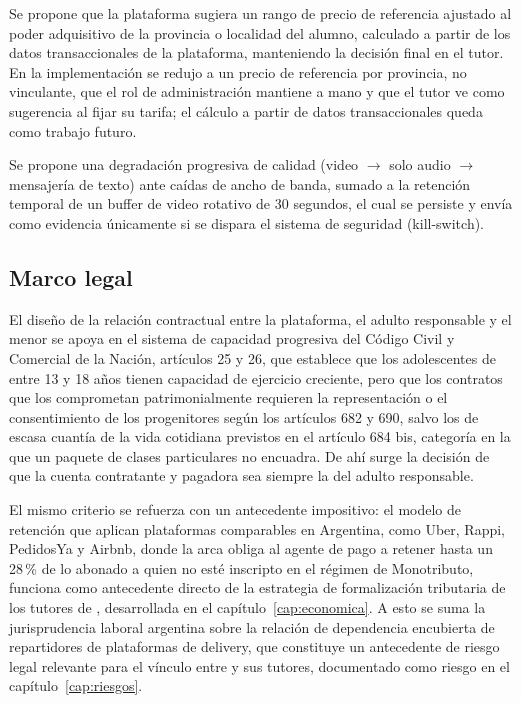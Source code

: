 \begin{description}[style=unboxed]
    \item[Precio dinámico por poder adquisitivo regional.] Se propone que
    la plataforma sugiera un rango de precio de referencia ajustado al
    poder adquisitivo de la provincia o localidad del alumno, calculado a
    partir de los datos transaccionales de la plataforma, manteniendo la
    decisión final en el tutor. En la implementación se redujo a un precio
    de referencia por provincia, no vinculante, que el rol de
    administración mantiene a mano y que el tutor ve como sugerencia al
    fijar su tarifa; el cálculo a partir de datos transaccionales queda
    como trabajo futuro.

    \item[Modo de baja conectividad.] Se propone una degradación
    progresiva de calidad (video $\rightarrow$ solo audio
    $\rightarrow$ mensajería de texto) ante caídas de ancho de banda,
    sumado a la retención temporal de un buffer de video rotativo de 30
    segundos, el cual se persiste y envía como evidencia únicamente si se
    dispara el sistema de seguridad (kill-switch).
\end{description}

\subsection{Marco legal}

El diseño de la relación contractual entre la plataforma, el adulto
responsable y el menor se apoya en el sistema de capacidad progresiva
del Código Civil y Comercial de la Nación, artículos 25 y 26, que
establece que los adolescentes de entre 13 y 18 años tienen capacidad de
ejercicio creciente, pero que los contratos que los comprometan
patrimonialmente requieren la representación o el consentimiento de los
progenitores según los artículos 682 y 690, salvo los de escasa cuantía
de la vida cotidiana previstos en el artículo 684 bis, categoría en la
que un paquete de clases particulares no encuadra. De ahí surge la
decisión de que la cuenta contratante y pagadora sea siempre la del
adulto responsable.

El mismo criterio se refuerza con un antecedente impositivo: el modelo
de retención que aplican plataformas comparables en Argentina, como
Uber, Rappi, PedidosYa y Airbnb, donde la \gls{arca} obliga al agente de pago a
retener hasta un 28\,\% de lo abonado a quien no esté inscripto en el
régimen de Monotributo, funciona como antecedente directo de la
estrategia de formalización tributaria de los tutores de \sistema{},
desarrollada en el capítulo~\ref{cap:economica}. A esto se suma la
jurisprudencia laboral argentina sobre la relación de dependencia
encubierta de repartidores de plataformas de delivery, que constituye un
antecedente de riesgo legal relevante para el vínculo entre \sistema{} y
sus tutores, documentado como riesgo en el capítulo~\ref{cap:riesgos}.

